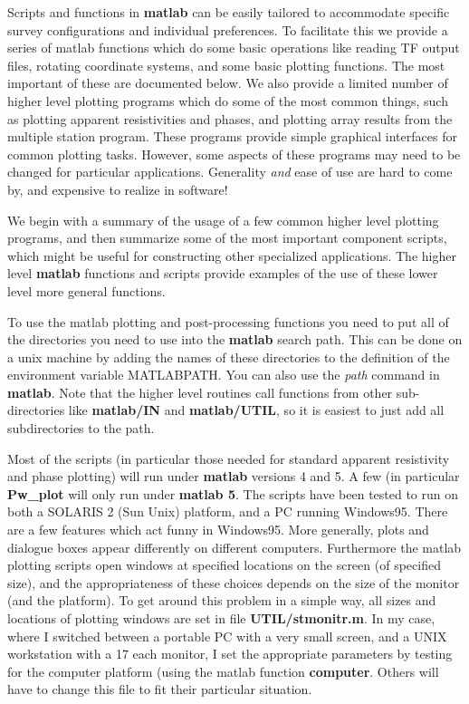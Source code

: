 Scripts and functions in 
{\bf matlab} can be easily tailored to accommodate specific
survey configurations and individual preferences.
To facilitate this we provide a series of matlab functions which
do some basic operations like reading TF output files, rotating
coordinate systems, and some basic plotting functions.
The most important of these are documented below.
We also provide a limited number of higher level plotting programs
which do some of the most common things, such as plotting apparent
resistivities and phases, and plotting array results from the
multiple station program.  These programs provide simple graphical
interfaces for common plotting tasks.  However, some aspects of these
programs may need to be changed for particular applications.
Generality {\it and} ease of use are hard to come by,
and expensive to realize in software!

We begin with a summary of the usage of a few common higher level
plotting programs, and then summarize some of the most important
component scripts, which might be useful for constructing other
specialized applications.  The higher level {\bf matlab} functions
and scripts provide examples of the use of these lower level more general
functions.

To use the matlab plotting and post-processing functions you need
to put all of the directories you need to use into the {\bf matlab}
search path.  This can be done on a unix machine by adding 
the names of these directories to the definition of the environment
variable MATLABPATH.  You can also use the {\it path} command in
{\bf matlab}.  Note that the higher level routines call functions from
other sub-directories like {\bf matlab/IN} and {\bf matlab/UTIL},
so it is easiest to just add all subdirectories to the path.

Most of the scripts (in particular
those needed for standard apparent resistivity and phase plotting)
will run under {\bf matlab} versions 4 and 5.
A few (in particular {\bf Pw\_plot} will only run under {\bf matlab 5}.
The scripts have been tested to run on both a SOLARIS 2 (Sun
Unix) platform, and a PC running Windows95.
There are a few features which act funny in Windows95. 
More generally, plots and dialogue boxes appear differently
on different computers. 
Furthermore the matlab
plotting scripts open windows at specified locations on the
screen (of specified size), and 
the appropriateness of these choices depends
on the size of the monitor (and the platform).  
To get around this problem in a simple way, all sizes
and locations of plotting windows are set in file {\bf UTIL/stmonitr.m}.
In my case, where I switched between a portable PC with a very
small screen, and a UNIX workstation with a 17 each monitor,
I set the appropriate parameters by testing for the computer
platform (using the matlab function {\bf computer}.
Others will have to change this file to fit their particular
situation.
 

